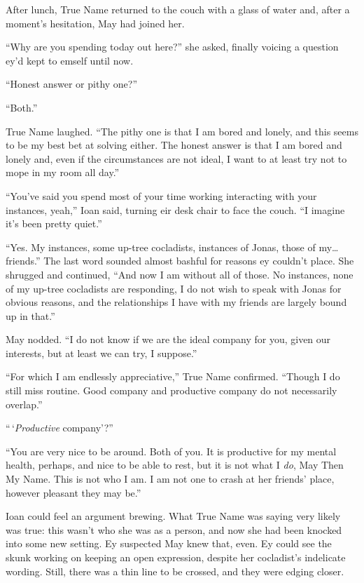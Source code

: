After lunch, True Name returned to the couch with a glass of water and, after a moment's hesitation, May had joined her.

``Why are you spending today out here?'' she asked, finally voicing a question ey'd kept to emself until now.

``Honest answer or pithy one?''

``Both.''

True Name laughed. ``The pithy one is that I am bored and lonely, and this seems to be my best bet at solving either. The honest answer is that I am bored and lonely and, even if the circumstances are not ideal, I want to at least try not to mope in my room all day.''

``You've said you spend most of your time working interacting with your instances, yeah,'' Ioan said, turning eir desk chair to face the couch. ``I imagine it's been pretty quiet.''

``Yes. My instances, some up-tree cocladists, instances of Jonas, those of my\ldots friends.'' The last word sounded almost bashful for reasons ey couldn't place. She shrugged and continued, ``And now I am without all of those. No instances, none of my up-tree cocladists are responding, I do not wish to speak with Jonas for obvious reasons, and the relationships I have with my friends are largely bound up in that.''

May nodded. ``I do not know if we are the ideal company for you, given our interests, but at least we can try, I suppose.''

``For which I am endlessly appreciative,'' True Name confirmed. ``Though I do still miss routine. Good company and productive company do not necessarily overlap.''

``\,`\emph{Productive} company'?''

``You are very nice to be around. Both of you. It is productive for my mental health, perhaps, and nice to be able to rest, but it is not what I \emph{do}, May Then My Name. This is not who I am. I am not one to crash at her friends' place, however pleasant they may be.''

Ioan could feel an argument brewing. What True Name was saying very likely was true: this wasn't who she was as a person, and now she had been knocked into some new setting. Ey suspected May knew that, even. Ey could see the skunk working on keeping an open expression, despite her cocladist's indelicate wording. Still, there was a thin line to be crossed, and they were edging closer.


